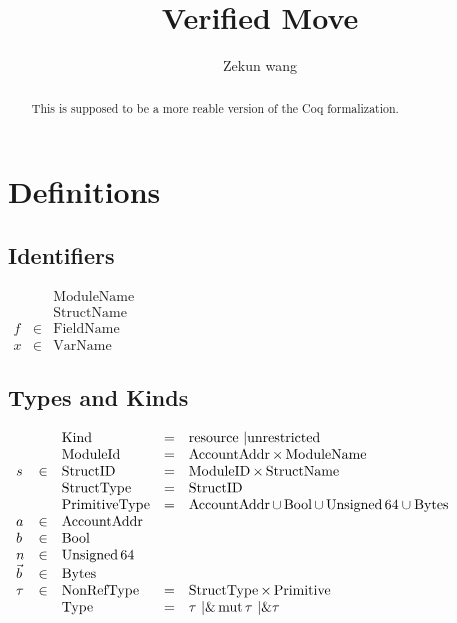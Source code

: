 \documentclass{article}
\newcommand{\tmop}[1]{\ensuremath{\operatorname{#1}}}
\newcommand{\tmstrong}[1]{\textbf{#1}}
\begin{document}
\title{Verified Move}

\author{Zekun wang}

\maketitle

\begin{abstract}
  This is supposed to be a more reable version of the Coq formalization.
\end{abstract}

\section{Definitions}

\subsection{Identifiers}

$\begin{array}{lll}
  &  & \tmop{ModuleName}\\
  &  & \tmop{StructName}\\
  f & \in & \tmop{FieldName}\\
  x & \in & \tmop{VarName}
\end{array}$

\subsection{Types and Kinds}

$\begin{array}{lllll}
  &  & \tmop{Kind} & = & \tmstrong{\tmop{resource}} \text{ \textbar
  $\tmstrong{\tmop{unrestricted}}$}\\
  &  & \tmop{ModuleId} & = & \tmop{AccountAddr} \times \tmop{ModuleName}\\
  s & \in & \tmop{StructID} & = & \tmop{ModuleID} \times \tmop{StructName}\\
  &  & \tmop{StructType} & = & \tmop{StructID}\\
  &  & \tmop{PrimitiveType} & = & \tmop{AccountAddr} \cup \tmop{Bool} \cup
  \tmop{Unsigned} 64 \cup \tmop{Bytes}\\
  a & \in & \tmop{AccountAddr} &  & \\
  b & \in & \tmop{Bool} &  & \\
  n & \in & \tmop{Unsigned} 64 &  & \\
  \vec{b} & \in & \tmop{Bytes} &  & \\
  \tau & \in & \tmop{NonRefType} & = & \tmop{StructType} \times
  \tmop{Primitive}\\
  &  & \tmop{Type} & = & \text{$\tau$ \textbar $\&\tmop{mut} \tau$ \textbar
  $\&\tau$ }
\end{array}$
\end{document}
